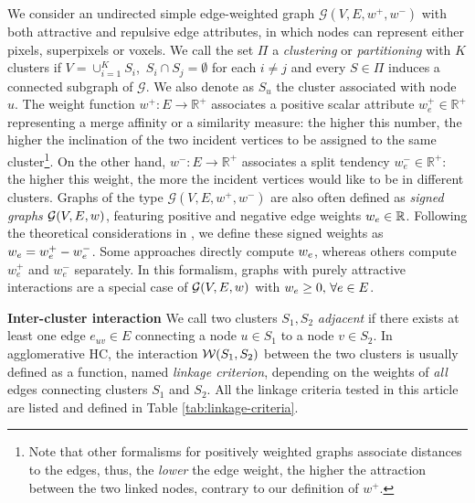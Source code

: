 We consider an undirected simple edge-weighted graph $\mathcal{G}(V,E,w^+, w^-)$ with both attractive and repulsive edge attributes, in which nodes can represent either pixels, superpixels or voxels. We call the set $\Pi$ a \emph{clustering} or \emph{partitioning} with $K$ clusters if $V = \cup_{i=1}^K S_i $, $\,S_i \cap S_j = \emptyset$ for each $i\neq j$ and every $S \in \Pi$ induces a connected subgraph of $\mathcal{G}$. We also denote as $S_u$ the cluster associated with node $u$.
The weight function $w^+: E \rightarrow \mathbb{R}^+$ associates a positive scalar attribute $w_e^+\in \mathbb{R}^+$ representing a merge affinity or a similarity measure: the higher this number, the higher the inclination of the two incident vertices to be assigned to the same cluster\footnote{Note that other formalisms  for positively weighted graphs associate distances to the edges, thus, the \emph{lower} the edge weight, the higher the attraction between the two linked nodes, contrary to our definition of $w^+$.}. On the other hand, $w^-: E \rightarrow \mathbb{R}^+$ associates a split tendency $w_e^- \in \mathbb{R}^+$: the higher this weight, the more the incident vertices would like to be in different clusters. 
Graphs of the type $\mathcal{G}(V,E,w^+, w^-)$ are also often defined as \emph{signed graphs} $\mathcal{G}(V,E,w)$, featuring positive and negative edge weights $w_e\in \mathbb{R}$. Following the theoretical considerations in \cite{lange2018partial}, we define these signed weights as ${w_e = w_e^+ - w_e^-}$. Some approaches directly compute $w_e$, whereas others compute $w_e^+$ and $w_e^-$ separately.
In this formalism, graphs with purely attractive interactions are a special case of $\mathcal{G}(V,E,w)$ with $w_e \geq 0, \, \forall e \in E$.

\textbf{Inter-cluster interaction } We call two clusters $S_1,S_2$ \emph{adjacent} if there exists at least one edge ${e_{uv}\in E}$ connecting a node $u\in S_1$ to a node $v\in S_2$. In agglomerative HC, the interaction $\mathcal{W}(S_1,S_2)$ between the two clusters is usually defined as a function, named \emph{linkage criterion}, depending on the weights of \emph{all} edges connecting clusters $S_1$ and $S_2$. 
All the linkage criteria tested in this article are listed and defined in Table \ref{tab:linkage-criteria}.

